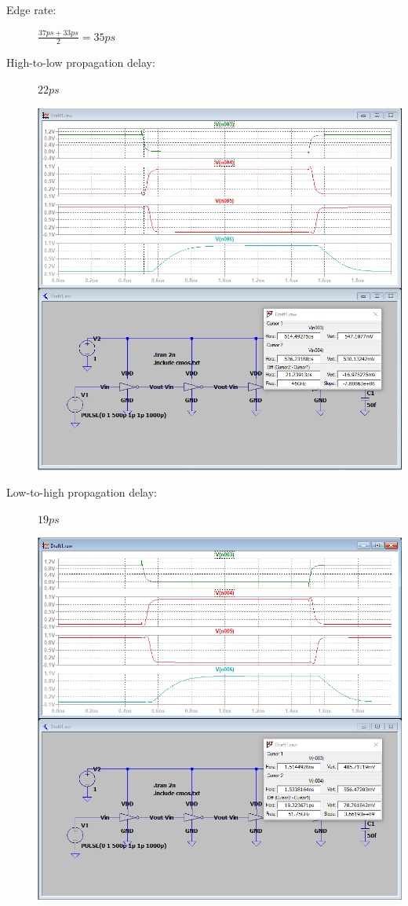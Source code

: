 \documentclass[a4paper, 11pt]{article}
\begin{document}
\begin{description}
\begin{center}
	      \end{center}
	\item[Edge rate:] $\frac{37ps + 33ps}{2} = 35ps$
	      \pagebreak
	\item[High-to-low propagation delay:] $22ps$ \hfill
	      \begin{center}
		      \includegraphics[scale=0.38]{mikro_lab3/high_to_low1.PNG}
	      \end{center}
	\item[Low-to-high propagation delay:] $19ps$ \hfill
	      \begin{center}
		      \includegraphics[scale=0.38]{mikro_lab3/low_to_high1.PNG}

\end{center}
\end{description}
\end{document}
